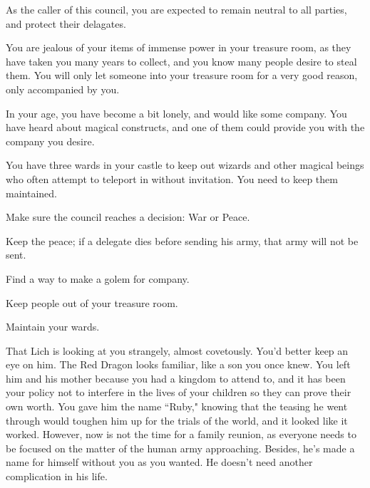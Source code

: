 \documentclass[char]{guildcamp2}
\begin{document}
	As the caller of this council, you are expected to remain neutral to all parties, and protect their delagates.
	
	You are jealous of your items of immense power in your treasure room, as they have taken you many years to collect, and you know many people desire to steal them. You will only let someone into your treasure room for a very good reason, only accompanied by you.
	
	In your age, you have become a bit lonely, and would like some company. You have heard about magical constructs, and one of them could provide you with the company you desire.
	
	You have three wards in your castle to keep out wizards and other magical beings who often attempt to teleport in without invitation. You need to keep them maintained.
	
	
	\begin{itemz}[Goals]
  \item Make sure the council reaches a decision: War or Peace.
	\item Keep the peace; if a delegate dies before sending  his army, that army will not be sent.
	\item Find a way to make a golem for company.
	\item Keep people out of your treasure room.
	\item Maintain your wards.
\end{itemz}

\begin{contacts}
  \contact{\cLich{}} That Lich is looking at you strangely, almost covetously. You’d better keep an eye on him.
	\contact{\cRed{}} The Red Dragon looks familiar, like a son you once knew. You left him and his mother because you had a kingdom to attend to, and it has been your policy not to interfere in the lives of your children so they can prove their own worth. You gave him the name ``Ruby," knowing that the teasing he went through would toughen him up for the trials of the world, and it looked like it worked. However, now is not the time for a family reunion, as everyone needs to be focused on the matter of the human army approaching. Besides, he's made a name for himself without you as you wanted. He doesn't need another complication in his life.
	
	
\end{contacts}
\end{document}
